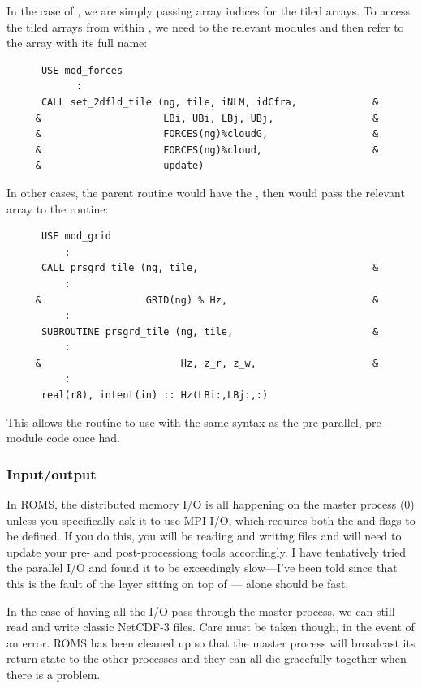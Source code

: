 In the case of , we are simply passing array indices
for the tiled arrays. To access the tiled arrays from within
, we need to  the relevant modules
and then refer to the array with its full name:
\begin{verbatim}
      USE mod_forces
            :
      CALL set_2dfld_tile (ng, tile, iNLM, idCfra,             &
     &                     LBi, UBi, LBj, UBj,                 &
     &                     FORCES(ng)%cloudG,                  &
     &                     FORCES(ng)%cloud,                   &
     &                     update)
\end{verbatim}
In other cases, the parent routine would have the , then
would pass the relevant array to the  routine:
\begin{verbatim}
      USE mod_grid
          :
      CALL prsgrd_tile (ng, tile,                              &
          :
     &                  GRID(ng) % Hz,                         &
          :
      SUBROUTINE prsgrd_tile (ng, tile,                        &
          :
     &                        Hz, z_r, z_w,                    &
          :
      real(r8), intent(in) :: Hz(LBi:,LBj:,:)
\end{verbatim}
This allows the  routine to use  with the same
syntax as the pre-parallel, pre-module code once had.

\subsubsection{Input/output}

In ROMS, the distributed memory I/O is all happening on the master process
(0) unless you specifically ask it to use MPI-I/O, which requires both the
 and   flags to be defined.
If you do this, you will be reading and writing  files and
will need to update your pre- and post-processiong tools accordingly. I
have tentatively tried the parallel I/O and found it to be exceedingly
slow---I've been told since that this is the fault of the 
layer sitting on top of --- alone should be fast.

In the case of having all the I/O pass through the master process,
we can still read and write classic NetCDF-3 files. Care must be
taken though, in the event of an error. ROMS has been cleaned up so
that the master process will broadcast its return state to the other
processes and they can all die gracefully together when there is a
problem.

